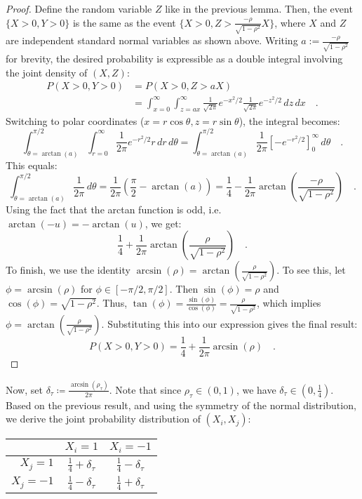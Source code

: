 \documentclass[../../main.tex]{subfiles}
\begin{document}
\begin{proof}
Define the random variable $Z$ like in the previous lemma. Then, the event $\{X>0, Y>0\}$ is the same as the event $\{X>0, Z > \frac{-\rho}{\sqrt{1-\rho^2}}X\}$, where $X$ and $Z$ are independent standard normal variables as shown above. Writing $a := \frac{-\rho}{\sqrt{1-\rho^2}}$ for brevity, the desired probability is expressible as a double integral involving the joint density of $(X,Z)$:
\begin{align*}
    P(X>0, Y>0) &= P(X>0, Z>aX) \\
    &= \int_{x=0}^{\infty} \int_{z=ax}^{\infty} \frac{1}{\sqrt{2\pi}}e^{-x^2/2} \frac{1}{\sqrt{2\pi}}e^{-z^2/2} \,dz\,dx \quad .
\end{align*}
Switching to polar coordinates ($x=r\cos\theta, z=r\sin\theta$), the integral becomes:
$$ \int_{\theta=\arctan(a)}^{\pi/2} \int_{r=0}^{\infty} \frac{1}{2\pi} e^{-r^2/2} r \,dr\,d\theta = \int_{\theta=\arctan(a)}^{\pi/2} \frac{1}{2\pi} \left[-e^{-r^2/2}\right]_0^\infty \,d\theta \quad . $$
This equals:
$$ \int_{\theta=\arctan(a)}^{\pi/2} \frac{1}{2\pi} \,d\theta = \frac{1}{2\pi}\left(\frac{\pi}{2} - \arctan(a)\right) = \frac{1}{4} - \frac{1}{2\pi}\arctan\left(\frac{-\rho}{\sqrt{1-\rho^2}}\right) \quad  .$$
Using the fact that the arctan function is odd, i.e. $\arctan(-u) = -\arctan(u)$, we get:
$$ \frac{1}{4} + \frac{1}{2\pi}\arctan\left(\frac{\rho}{\sqrt{1-\rho^2}}\right) \quad . $$
To finish, we use the identity $\arcsin(\rho) = \arctan\left(\frac{\rho}{\sqrt{1-\rho^2}}\right)$. To see this, let $\phi = \arcsin(\rho)$ for $\phi \in [-\pi/2, \pi/2]$. Then $\sin(\phi) = \rho$ and $\cos(\phi) = \sqrt{1-\rho^2}$. Thus, $\tan(\phi) = \frac{\sin(\phi)}{\cos(\phi)} = \frac{\rho}{\sqrt{1-\rho^2}}$, which implies $\phi = \arctan\left(\frac{\rho}{\sqrt{1-\rho^2}}\right)$.
Substituting this into our expression gives the final result:
$$ P(X>0, Y>0) = \frac{1}{4} + \frac{1}{2\pi}\arcsin(\rho) \quad . $$
\end{proof}

Now, set $\delta_\tau \coloneqq \frac{\arcsin(\rho_\tau)}{2\pi}$. Note that since $\rho_\tau \in (0, 1)$, we have $\delta_\tau \in (0, \frac{1}{4})$. Based on the previous result, and using the symmetry of the normal distribution, we derive the joint probability distribution of $(X_i, X_j)$:
\begin{table}[h]
    \centering
    \begin{tabular}{r|c|c}
        & $X_i = 1$ & $X_i = -1$ \\
        \hline
        \rule{0pt}{15pt} $X_j = 1$ & $\frac{1}{4} + \delta_\tau$ & $\frac{1}{4} - \delta_\tau$ \\
        \rule{0pt}{15pt} $X_j = -1$ & $\frac{1}{4} - \delta_\tau$ & $\frac{1}{4} + \delta_\tau$
    \end{tabular}
\end{table}
\end{document}
